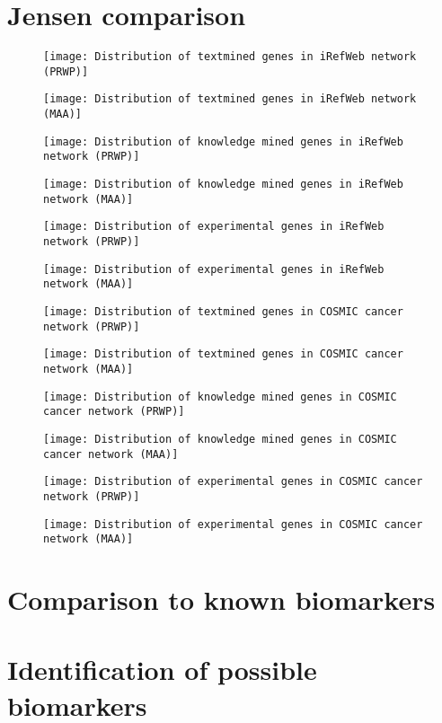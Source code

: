\section{Jensen comparison}
\begin{figure}
    \label{fig:txt-irefweb-prwp}
    \texttt{[image: Distribution of textmined genes in iRefWeb network (PRWP)]}
\end{figure}
\begin{figure}
    \label{fig:txt-irefweb-maa}
    \texttt{[image: Distribution of textmined genes in iRefWeb network (MAA)]}
\end{figure}
\begin{figure}
    \label{fig:know-irefweb-prwp}
    \texttt{[image: Distribution of knowledge mined genes in iRefWeb network (PRWP)]}
\end{figure}
\begin{figure}
    \label{fig:know-irefweb-maa}
    \texttt{[image: Distribution of knowledge mined genes in iRefWeb network (MAA)]}
\end{figure}
\begin{figure}
    \label{fig:exp-irefweb-prwp}
    \texttt{[image: Distribution of experimental genes in iRefWeb network (PRWP)]}
\end{figure}
\begin{figure}
    \label{fig:exp-irefweb-maa}
    \texttt{[image: Distribution of experimental genes in iRefWeb network (MAA)]}
\end{figure}
\begin{figure}
    \label{fig:txt-cosmic-prwp}
    \texttt{[image: Distribution of textmined genes in COSMIC cancer network (PRWP)]}
\end{figure}
\begin{figure}
    \label{fig:txt-cosmic-maa}
    \texttt{[image: Distribution of textmined genes in COSMIC cancer network (MAA)]}
\end{figure}
\begin{figure}
    \label{fig:know-cosmic-prwp}
    \texttt{[image: Distribution of knowledge mined genes in COSMIC cancer network (PRWP)]}
\end{figure}
\begin{figure}
    \label{fig:know-cosmic-maa}
    \texttt{[image: Distribution of knowledge mined genes in COSMIC cancer network (MAA)]}
\end{figure}
\begin{figure}
    \label{fig:exp-cosmic-prwp}
    \texttt{[image: Distribution of experimental genes in COSMIC cancer network (PRWP)]}
\end{figure}
\begin{figure}
    \label{fig:exp-cosmic-maa}
    \texttt{[image: Distribution of experimental genes in COSMIC cancer network (MAA)]}
\end{figure}

\section{Comparison to known biomarkers}
\section{Identification of possible biomarkers}
